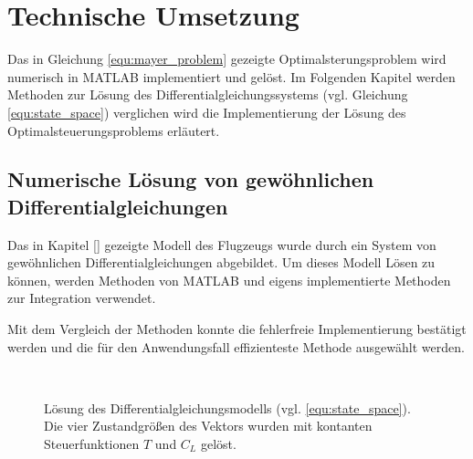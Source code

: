 \chapter{Technische Umsetzung}
Das in Gleichung \eqref{equ:mayer_problem} gezeigte Optimalsterungsproblem wird numerisch in MATLAB implementiert und gelöst. Im Folgenden Kapitel werden 
Methoden zur Lösung des Differentialgleichungssystems (vgl. Gleichung \eqref{equ:state_space}) verglichen wird die Implementierung der Lösung des 
Optimalsteuerungsproblems erläutert.

\section{Numerische Lösung von gewöhnlichen Differentialgleichungen}
Das in Kapitel \autoref{} gezeigte Modell des Flugzeugs wurde durch ein System von gewöhnlichen Differentialgleichungen abgebildet. Um dieses Modell
Lösen zu können, werden Methoden von MATLAB und eigens implementierte Methoden zur Integration verwendet.

Mit dem Vergleich der Methoden konnte die fehlerfreie Implementierung bestätigt werden und die für den Anwendungsfall effizienteste Methode 
ausgewählt werden.

        

\begin{figure}[!htbp]
    \centering 
    \qquad
     \\

    \qquad
    \caption{Lösung des Differentialgleichungsmodells (vgl. \eqref{equ:state_space}). Die vier Zustandgrößen des Vektors wurden mit kontanten Steuerfunktionen \(T\) und \(C_L\) gelöst.} %
\end{figure}

